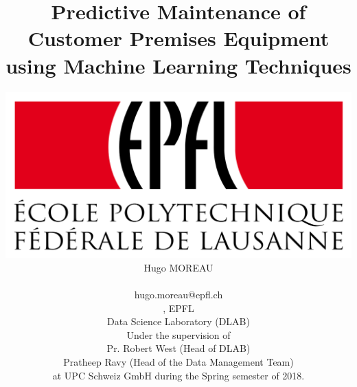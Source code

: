 \documentclass[10pt,a4paper,twocolumn]{report}
\begin{document}
\title{Predictive Maintenance of Customer Premises Equipment using Machine Learning Techniques}



\author{
	\includegraphics[width=0.2\linewidth]{EPFL}\\
	Hugo MOREAU\\
  	\begin{tt}hugo.moreau@epfl.ch\end{tt}, EPFL \\
	Data Science Laboratory (DLAB)\\
	Under the supervision of \\
	Pr. Robert West (Head of DLAB)\\
	Pratheep Ravy (Head of the Data Management Team)\\
	at UPC Schweiz GmbH during the Spring semester of 2018.
}

\maketitle{}
\setcounter{tocdepth}{4}
\tableofcontents








\printbibliography
\end{document}
